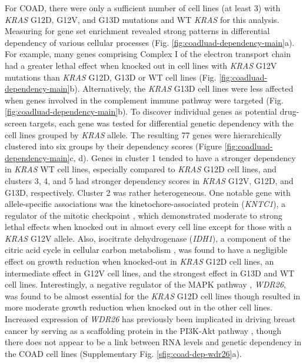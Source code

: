 \documentclass[english, 10pt, letterpaper]{article}
\newcommand{\KRAS}{\emph{KRAS}}
\begin{document}
For COAD, there were only a sufficient number of cell lines (at least 3) with \KRAS{} G12D, G12V, and G13D mutations and WT \KRAS{} for this analysis.
Measuring for gene set enrichment revealed strong patterns in differential dependency of various cellular processes (Fig. \ref{fig:coadluad-dependency-main}a).
For example, many genes comprising Complex I of the electron transport chain had a greater lethal effect when knocked out in cell lines with \KRAS{} G12V mutations than \KRAS{} G12D, G13D or WT cell lines (Fig. \ref{fig:coadluad-dependency-main}b).
Alternatively, the \KRAS{} G13D cell lines were less affected when genes involved in the complement immune pathway were targeted (Fig. \ref{fig:coadluad-dependency-main}b).
To discover individual genes as potential drug-screen targets, each gene was tested for differential genetic dependency with the cell lines grouped by \KRAS{} allele. 
The resulting 77 genes were hierarchically clustered into six groups by their dependency scores (Figure \ref{fig:coadluad-dependency-main}c, d).
Genes in cluster 1 tended to have a stronger dependency in \KRAS{} WT cell lines, especially compared to \KRAS{} G12D cell lines, and clusters 3, 4, and 5 had stronger dependency scores in \KRAS{} G12V, G12D, and G13D, respectively. 
Cluster 2 was rather heterogeneous.
One notable gene with allele-specific associations was the kinetochore-associated protein (\emph{KNTC1}), a regulator of the mitotic checkpoint \cite{Chan2000HumanKinetochores., Scaerou2001TheKinetochore., Kops2005ZW10Kinetochore.}, which demonstrated moderate to strong lethal effects when knocked out in almost every cell line except for those with a \KRAS{} G12V allele.
Also, isocitrate dehydrogenase (\emph{IDH1}), a component of the citric acid cycle in cellular carbon metabolism \cite{Geisbrecht1999TheDehydrogenase.}, was found to have a negligible effect on growth reduction when knocked-out in \KRAS{} G12D cell lines, an intermediate effect in G12V cell lines, and the strongest effect in G13D and WT cell lines.
Interestingly, a negative regulator of the MAPK pathway \cite{Goto2016WDR26Pathway.}, \emph{WDR26}, was found to be almost essential for the \KRAS{} G12D cell lines though resulted in more moderate growth reduction when knocked out in the other cell lines.
Increased expression of \emph{WDR26} has previously been implicated in driving breast cancer by serving as a scaffolding protein in the PI3K-Akt pathway \cite{Ye2016UpregulatedInvasion.}, though there does not appear to be a link between RNA levels and genetic dependency in the COAD cell lines (Supplementary Fig. \ref{sfig:coad-dep-wdr26}a).
\end{document}
